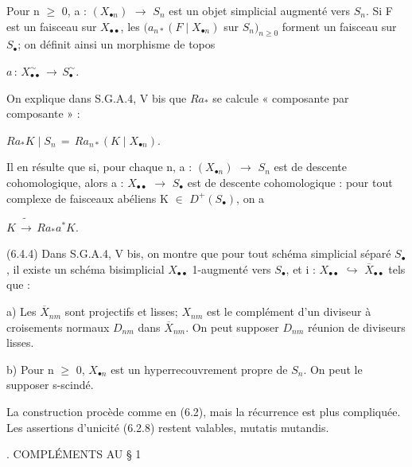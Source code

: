 \documentclass[11pt,twoside]{article}
\newcommand{\DFormula}[1]{%
  \par\smallskip\noindent\hspace*{0pt}\(\displaystyle #1\)\par\smallskip
}
\begin{document}
Pour n \(\geq \) 0, a : \((X_{\bullet n})\) \(\to \) \(S_{n}\) est un objet simplicial augmenté vers \(S_{n}\). Si F est un faisceau sur \(X_{\bullet \bullet }\), les \((a_{n\ast }(F\mid X_{\bullet n})\) sur \(S_{n})_{n\geq 0}\) forment un faisceau sur \(S_{\bullet }\); on définit ainsi un morphisme de topos\par
\par\medskip
\DFormula{a\,:\,X_{\bullet \bullet }^{\sim }\,\to \,S_{\bullet }^{\sim }.}
\par\medskip
On explique dans S.G.A.4, V bis que \(Ra_{\ast }\) se calcule « composante par composante » :\par
\par\medskip
\DFormula{Ra_{\ast }K\mid S_{n}\,=\,Ra_{n\ast }(K\mid X_{\bullet n}).}
\par\medskip
Il en résulte que si, pour chaque n, a : \((X_{\bullet n})\) \(\to \) \(S_{n}\) est de descente cohomologique, alors a : \(X_{\bullet \bullet }\) \(\to \) \(S_{\bullet }\) est de descente cohomologique : pour tout complexe de faisceaux abéliens K \(\in \) \(D^{+}(S_{\bullet })\), on a\par
\par\medskip
\DFormula{K\,\widetilde{\to }\,Ra_{\ast }a^{\ast }K.}
\par\medskip
(6.4.4) Dans S.G.A.4, V bis, on montre que pour tout schéma simplicial séparé \(S_{\bullet }\), il existe un schéma bisimplicial \(X_{\bullet \bullet }\) 1-augmenté vers \(S_{\bullet }\), et i : \(X_{\bullet \bullet }\) \(\hookrightarrow \) \(\overline{X}_{\bullet \bullet }\) tels que :\par
\par\medskip
a) Les \(\overline{X}_{nm}\) sont projectifs et lisses; \(X_{nm}\) est le complément d’un diviseur à croisements normaux \(D_{nm}\) dans \(\overline{X}_{nm}\). On peut supposer \(D_{nm}\) réunion de diviseurs lisses.\par
\par\medskip
b) Pour n \(\geq \) 0, \(X_{\bullet n}\) est un hyperrecouvrement propre de \(S_{n}\). On peut le supposer s-scindé.\par
\par\medskip
La construction procède comme en (6.2), mais la récurrence est plus compliquée. Les assertions d’unicité (6.2.8) restent valables, mutatis mutandis.\par
\par{}. COMPLÉMENTS AU § 1\par
\par\medskip
\end{document}
